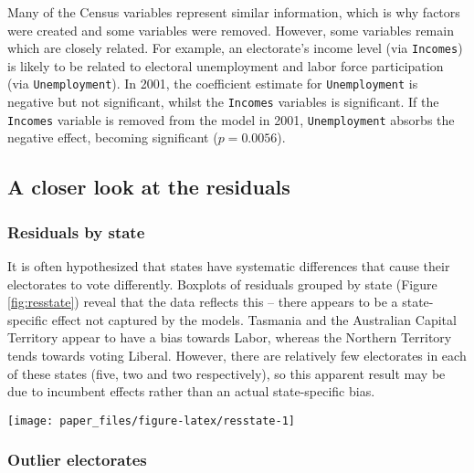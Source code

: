 \documentclass[times, doublespace]{anzsauth}
\let\origfigure\figure
\let\endorigfigure\endfigure
\renewenvironment{figure}[1][2] {
    \expandafter\origfigure\expandafter[htbp]
} {
    \endorigfigure
}
\begin{document}
Many of the Census variables represent similar information, which is why factors were created and some variables were removed. However, some variables remain which are closely related. For example, an electorate's income level (via \texttt{Incomes}) is likely to be related to electoral unemployment and labor force participation (via \texttt{Unemployment}). In 2001, the coefficient estimate for \texttt{Unemployment} is negative but not significant, whilst the \texttt{Incomes} variables is significant. If the \texttt{Incomes} variable is removed from the model in 2001, \texttt{Unemployment} absorbs the negative effect, becoming significant (\(p = 0.0056\)).

\hypertarget{a-closer-look-at-the-residuals}{%
\subsection{A closer look at the residuals}\label{a-closer-look-at-the-residuals}}

\hypertarget{residuals-by-state}{%
\subsubsection{Residuals by state}\label{residuals-by-state}}

It is often hypothesized that states have systematic differences that cause their electorates to vote differently. Boxplots of residuals grouped by state (Figure \ref{fig:resstate}) reveal that the data reflects this -- there appears to be a state-specific effect not captured by the models. Tasmania and the Australian Capital Territory appear to have a bias towards Labor, whereas the Northern Territory tends towards voting Liberal. However, there are relatively few electorates in each of these states (five, two and two respectively), so this apparent result may be due to incumbent effects rather than an actual state-specific bias.

\begin{figure}[h]

{\centering \texttt{[image: paper\_files/figure-latex/resstate-1]} 

}

\caption{Boxplot of residuals by state with jittered points. States ordered by median residual. A state-specific bias not captured by the model is evident.}\label{fig:resstate}
\end{figure}

\hypertarget{outlier-electorates}{%
\subsubsection{Outlier electorates}\label{outlier-electorates}}
\end{document}
